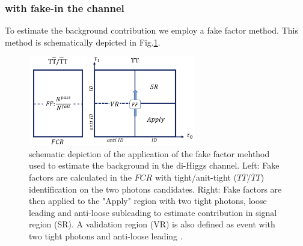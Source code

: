 \subsubsection{\yyjet with fake-\tauh in the \yytwotau channel}

To estimate the \yyjet background contribution we employ a fake factor method. This method is schematically depicted in Fig.\ref{fig:yy2tau:FFschem}.
\begin{figure}[]
	\begin{center}
	\includegraphics[width=0.65\textwidth]{figures/yy2tau/FFschem.png}
	\caption{\label{fig:yy2tau:FFschem} schematic depiction of the application of the fake factor mehthod used to estimate the \yyjet background in the di-Higgs \yytwotau channel. Left: Fake factors are calculated in the $FCR$ with tight/anit-tight ($T\overline{T}$/$\overline{T}T$) identification on the two photons candidates. Right: Fake factors are then applied to the "Apply" region with two tight photons, loose leading \tauh and anti-loose subleading \tauh to estimate \yytwotau contribution in signal region (SR). A validation region (VR) is also defined as event with two tight photons and anti-loose leading \tauh. }
	\end{center}
\end{figure}


